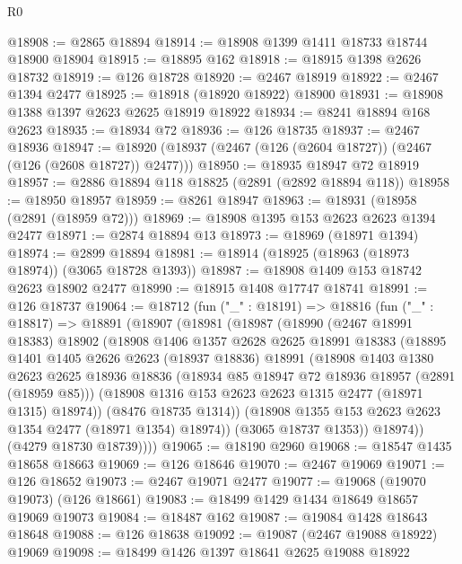 \begin{lexlean}{R0}
\begin{coremodule}
@18908 := @2865 @18894
@18914 := @18908 @1399 @1411 @18733 @18744 @18900 @18904
@18915 := @18895 @162
@18918 := @18915 @1398 @2626 @18732
@18919 := @126 @18728
@18920 := @2467 @18919
@18922 := @2467 @1394 @2477
@18925 := @18918 (@18920 @18922) @18900
@18931 := @18908 @1388 @1397 @2623 @2625 @18919 @18922
@18934 := @8241 @18894 @168 @2623
@18935 := @18934 @72
@18936 := @126 @18735
@18937 := @2467 @18936
@18947 := @18920 (@18937 (@2467 (@126 (@2604 @18727)) (@2467 (@126 (@2608 @18727)) @2477)))
@18950 := @18935 @18947 @72 @18919
@18957 := @2886 @18894 @118 @18825 (@2891 (@2892 @18894 @118))
@18958 := @18950 @18957
@18959 := @8261 @18947
@18963 := @18931 (@18958 (@2891 (@18959 @72)))
@18969 := @18908 @1395 @153 @2623 @2623 @1394 @2477
@18971 := @2874 @18894 @13
@18973 := @18969 (@18971 @1394)
@18974 := @2899 @18894
@18981 := @18914 (@18925 (@18963 (@18973 @18974)) (@3065 @18728 @1393))
@18987 := @18908 @1409 @153 @18742 @2623 @18902 @2477
@18990 := @18915 @1408 @17747 @18741
@18991 := @126 @18737
@19064 := @18712
    (fun ("_" : @18191) =>
    @18816
      (fun ("_" : @18817) =>
      @18891
        (@18907
          (@18981
            (@18987
              (@18990
                (@2467 @18991 @18383)
                @18902
                (@18908
                  @1406
                  @1357
                  @2628
                  @2625
                  @18991
                  @18383
                  (@18895
                    @1401
                    @1405
                    @2626
                    @2623
                    (@18937 @18836)
                    @18991
                    (@18908
                      @1403
                      @1380
                      @2623
                      @2625
                      @18936
                      @18836
                      (@18934 @85 @18947 @72 @18936 @18957 (@2891 (@18959 @85)))
                      (@18908 @1316 @153 @2623 @2623 @1315 @2477 (@18971 @1315) @18974))
                    (@8476 @18735 @1314))
                  (@18908 @1355 @153 @2623 @2623 @1354 @2477 (@18971 @1354) @18974))
                (@3065 @18737 @1353))
              @18974))
          (@4279 @18730 @18739))))
@19065 := @18190 @2960
@19068 := @18547 @1435 @18658 @18663
@19069 := @126 @18646
@19070 := @2467 @19069
@19071 := @126 @18652
@19073 := @2467 @19071 @2477
@19077 := @19068 (@19070 @19073) (@126 @18661)
@19083 := @18499 @1429 @1434 @18649 @18657 @19069 @19073
@19084 := @18487 @162
@19087 := @19084 @1428 @18643 @18648
@19088 := @126 @18638
@19092 := @19087 (@2467 @19088 @18922) @19069
@19098 := @18499 @1426 @1397 @18641 @2625 @19088 @18922

\end{coremodule}
\end{lexlean}
